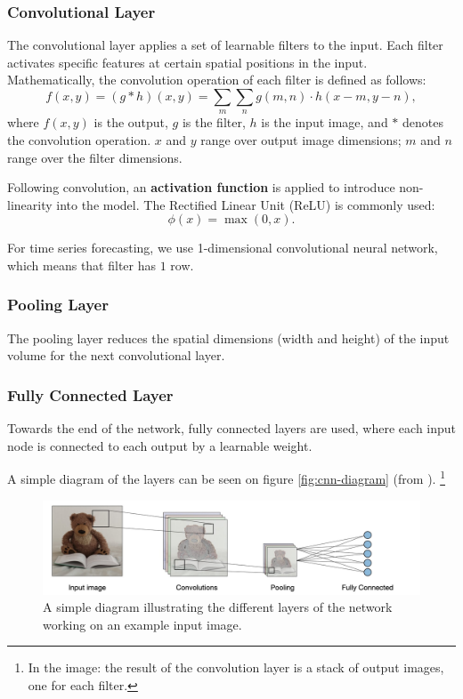 \subsubsection{Convolutional Layer}
The convolutional layer applies a set of learnable filters to the input. Each filter activates specific features at certain spatial positions in the input. Mathematically, the convolution operation of each filter is defined as follows:
\[f(x, y) = (g * h)(x, y) = \sum_m\sum_n g(m,n) \cdot h(x-m, y-n),\]
where \(f(x, y)\) is the output, \(g\) is the filter, \(h\) is the input image, and \(*\) denotes the convolution operation. \(x\) and \(y\) range over output image dimensions; \(m\) and \(n\) range over the filter dimensions.

Following convolution, an \textbf{activation function} is applied to introduce non-linearity into the model. The Rectified Linear Unit (ReLU) \label{relu} is commonly used:
\[\phi(x) = \max(0, x).\]

For time series forecasting, we use 1-dimensional convolutional neural network, which means that filter has \(1\) row.


\subsubsection{Pooling Layer}
The pooling layer reduces the spatial dimensions (width and height) of the input volume for the next convolutional layer.

\subsubsection{Fully Connected Layer}
Towards the end of the network, fully connected layers are used, where each input node is connected to each output by a learnable weight.

A simple diagram of the layers can be seen on figure \autoref{fig:cnn-diagram} (from \cite{cnn_diagram_source}). \footnote{In the image: the result of the convolution layer is a stack of output images, one for each filter.}

\begin{figure}[h!]
	\centering
	\includegraphics[width=0.5\linewidth]{"pictures/architecture-cnn-en.jpeg"}
	\caption{A simple diagram illustrating the different layers of the network working on an example input image.}
	\label{fig:cnn-diagram}

\end{figure}

